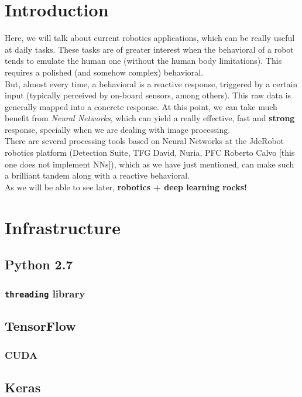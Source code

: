 \chapter{Introduction}
Here, we will talk about current robotics applications, which can be really useful at daily tasks. These tasks are of greater interest when the behavioral of a robot tends to emulate the human one (without the human body limitations). This requires a polished (and somehow complex) behavioral.\\

But, almost every time, a behavioral is a reactive response, triggered by a certain input (typically perceived by on-board sensors, among others). This raw data is generally mapped into a concrete response. At this point, we can take much benefit from \emph{Neural Networks}, which can yield a really effective, fast and \textbf{strong} response, specially when we are dealing with image processing.\\

There are several processing tools based on Neural Networks at the JdeRobot robotics platform (Detection Suite, TFG David, Nuria, PFC Roberto Calvo [this one does not implement NNs]), which as we have just mentioned, can make such a brilliant tandem along with a reactive behavioral.\\

As we will be able to see later, \textbf{robotics + deep learning rocks!}

\chapter{Infrastructure}
\section{Python 2.7}
\subsection{\texttt{threading} library}
\section{TensorFlow}
\subsection{CUDA}
\section{Keras}
